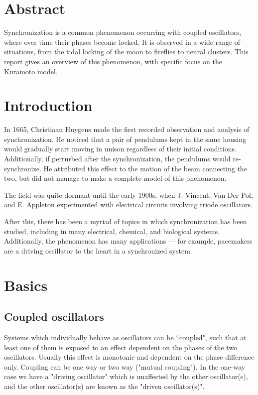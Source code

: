 \documentclass[12pt]{article}
\begin{document}
\section*{Abstract}
Synchronization is a common phenomenon occurring with coupled oscillators, where over time their phases become locked. It is observed in a wide range of situations, from the tidal locking of the moon to fireflies to neural clusters. This report gives an overview of this phenomenon, with specific focus on the Kuramoto model.
\pagebreak
\addtocounter{section}{-4}
\tableofcontents\newpage
\section{Introduction}

In 1665, Christiaan Huygens made the first recorded observation and analysis of synchronization\cite{bennett2002huygens}. He noticed that a pair of pendulums kept in the same housing would gradually start moving in unison regardless of their initial conditions. Additionally, if perturbed after the synchronization, the pendulums would re-synchronize. He attributed this effect to the motion of the beam connecting the two, but did not manage to make a complete model of this phenomenon.

The field was quite dormant until the early 1900s, when J. Vincent\cite{vincent1919some}, Van Der Pol\cite{van1920theory}, and E. Appleton\cite{appleton1922automatic} experimented with electrical circuits involving triode oscillators.

After this, there has been a myriad of topics in which synchronization has been studied, including in many electrical, chemical, and biological systems. Additionally, the phenomenon has many applications --- for example, pacemakers are a driving oscillator to the heart in a synchronized system.

\section{Basics}
\subsection{Coupled oscillators}
Systems which individually behave as oscillators can be ``coupled", such that at least one of them is exposed to an effect dependent on the phases of the two oscillators. Usually this effect is monotonic and dependent on the phase difference only. Coupling can be one way or two way ("mutual coupling"). In the one-way case we have a "driving oscillator" which is unaffected by the other oscillator(s), and the other oscillator(s) are known as the "driven oscillator(s)".
\end{document}
